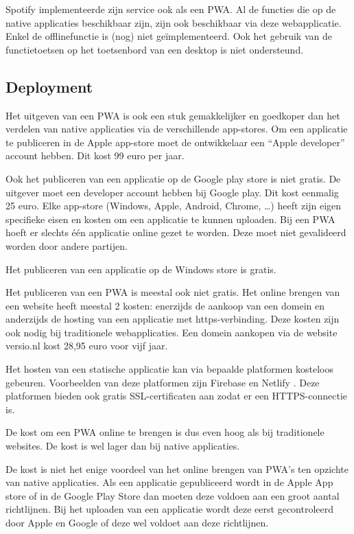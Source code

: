 	Spotify implementeerde zijn service ook als een PWA. \autocite{Spotify2020} Al de functies die op de native applicaties beschikbaar zijn, zijn ook beschikbaar via deze webapplicatie. Enkel de offlinefunctie is (nog) niet geïmplementeerd. Ook het gebruik van de functietoetsen op het toetsenbord van een desktop is niet ondersteund.
	\autocite{Vu2019}
	
	
\subsection{Deployment}

	Het uitgeven van een PWA is ook een stuk gemakkelijker en goedkoper dan het verdelen van native applicaties via de verschillende app-stores. 
	Om een applicatie te publiceren in de Apple app-store moet de ontwikkelaar een “Apple developer” account hebben. Dit kost 99 euro per jaar. 
	\autocite{Apple2020b}
	
	Ook het publiceren van een applicatie op de Google play store is niet gratis. De uitgever moet een developer account hebben bij Google play. Dit kost eenmalig 25 euro.
	Elke app-store (Windows, Apple, Android, Chrome, …) heeft zijn eigen specifieke eisen en kosten om een applicatie te kunnen uploaden. Bij een PWA hoeft er slechts één applicatie online gezet te worden. Deze moet niet gevalideerd worden door andere partijen. 
	\autocite{GooglePlay2020}
	
	Het publiceren van een applicatie op de Windows store is gratis.
	
	Het publiceren van een PWA is meestal ook niet gratis. Het online brengen van een website heeft meestal 2 kosten: enerzijds de aankoop van een domein en anderzijds de hosting van een applicatie met https-verbinding. Deze kosten zijn ook nodig bij traditionele webapplicaties.
	Een domein aankopen via de website versio.nl kost 28,95 euro voor vijf jaar.
	\autocite{Versio2020}
	
	Het hosten van een statische applicatie kan via bepaalde platformen kosteloos gebeuren. Voorbeelden van deze platformen zijn Firebase \autocite{Firebase2020} en Netlify \autocite{Netflify2020}. 	
	Deze platformen bieden ook gratis SSL-certificaten aan zodat er een HTTPS-connectie is. 
	
	De kost om een PWA online te brengen is dus even hoog als bij traditionele websites. De kost is wel lager dan bij native applicaties. 	
	
	De kost is niet het enige voordeel van het online brengen van PWA's ten opzichte van native applicaties. Als een applicatie gepubliceerd wordt in de Apple App store of in de Google Play Store dan moeten deze voldoen aan een groot aantal richtlijnen. Bij het uploaden van een applicatie wordt deze eerst gecontroleerd door Apple en Google of deze wel voldoet aan deze richtlijnen. 
	\autocite{Apple2020c}
	\autocite{GooglePlay2020a}
	
